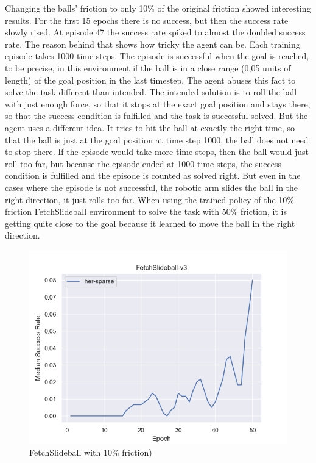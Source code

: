 Changing the balls' friction to only 10\% of the original friction showed interesting results. For the first 15 epochs there is no success, but then the success rate slowly rised. At episode 47 the success rate spiked to almost the doubled success rate. The reason behind that shows how tricky the agent can be. Each training episode takes 1000 time steps. The episode is successful when the goal is reached, to be precise, in this environment if the ball is in a close range (0,05 units of length) of the goal position in the last timestep.
The agent abuses this fact to solve the task different than intended. The intended solution is to roll the ball with just enough force, so that it stops at the exact goal position and stays there, so that the success condition is fulfilled and the task is successful solved. But the agent uses a different idea. It tries to hit the ball at exactly the right time, so that the ball is just at the goal position at time step 1000, the ball does not need to stop there. If the episode would take more time steps, then the ball would just roll too far, but because the episode ended at 1000 time steps, the success condition is fulfilled and the episode is counted as solved right.
But even in the cases where the episode is not successful, the robotic arm slides the ball in the right direction, it just rolls too far. When using the trained policy of the 10\% friction FetchSlideball environment to solve the task with 50\% friction, it is getting quite close to the goal because it learned to move the ball in the right direction.


\begin{figure} [h]
	
	\centering
	\includegraphics[width=1\textwidth]{figures/fig_FetchSlideball-v3.png}
	\caption{FetchSlideball with 10\% friction)}
	
\end{figure}

